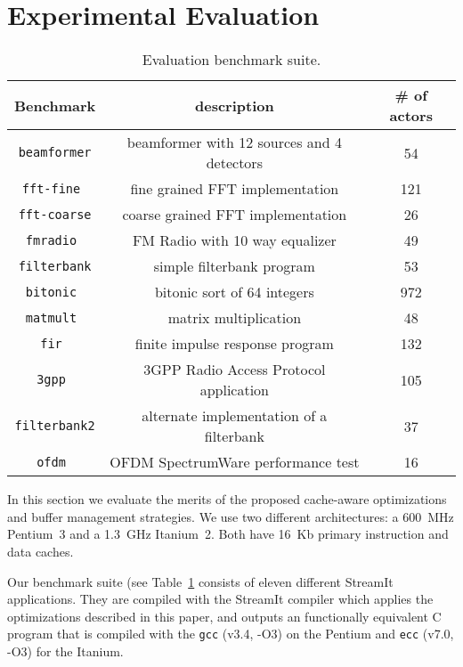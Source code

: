 \section{Experimental Evaluation}
\label{sec:evaluation}

\begin{table}[t]
\center
\label{tab:benchmarks}
\vspace{-12pt}
{\tiny
\begin{tabular}{|c|c|c|} \hline
{\bf Benchmark}&{\bf description}&{\bf \# of actors}\\ \hline \hline
\texttt{beamformer} &beamformer with 12 sources and 4 detectors& 54 \\ \hline
\texttt{fft-fine	} &fine grained FFT implementation	&	121 \\ \hline
\texttt{fft-coarse} &coarse grained FFT implementation	&	26 \\ \hline
\texttt{fmradio	} &FM Radio with 10 way equalizer	&	49 \\ \hline
\texttt{filterbank} &simple filterbank program	&	53 \\ \hline
\texttt{bitonic	} &bitonic sort of 64 integers	&	972 \\ \hline
\texttt{matmult	} &matrix multiplication	&	48 \\ \hline
\texttt{fir	      } &finite impulse response program	&	132 \\ \hline
\texttt{3gpp	} &3GPP Radio Access Protocol application	&	105 \\ \hline
\texttt{filterbank2}&alternate implementation of a filterbank &	37 \\ \hline
\texttt{ofdm	 }&OFDM SpectrumWare performance test	&	16 \\ \hline
\end{tabular}
}
\vspace{-12pt}
\caption{Evaluation benchmark suite.}
\end{table}


In this section we evaluate the merits of the proposed cache-aware
optimizations and buffer management strategies. We use two
different architectures: a 600~MHz Pentium~3 and a 1.3~GHz
Itanium~2. Both have 16~Kb primary instruction and data caches.

Our benchmark suite (see Table~\ref{tab:benchmarks} consists of eleven
different StreamIt applications. They are compiled with the StreamIt
compiler which applies the optimizations described in this paper, and
outputs an functionally equivalent C program that is compiled with the
\texttt{gcc} (v3.4, -O3) on the Pentium and \texttt{ecc} 
(v7.0, -O3) for the Itanium.


